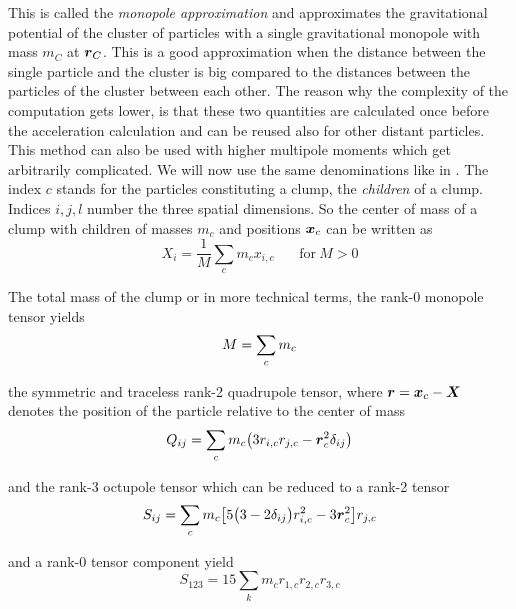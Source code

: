 This is called the \emph{monopole approximation} and approximates the gravitational potential of the cluster of particles with a single gravitational monopole with mass $m_C$ at $\boldsymbol{r}_C$. This is a good approximation when the distance between the single particle and the cluster is big compared to the distances between the particles of the cluster between each other. The reason why the complexity of the computation gets lower, is that these two quantities are calculated once before the acceleration calculation and can be reused also for other distant particles. \\

This method can also be used with higher multipole moments which get arbitrarily complicated. We will now use the same denominations like in \cite{1993ApJ...414..200M}. The index $c$ stands for the particles constituting a clump, the \emph{children} of a clump. Indices $i, j, l$ number the three spatial dimensions. So the center of mass of a clump with children of masses $m_{c}$ and positions $\boldsymbol{x}_{c}$ can be written as
\begin{equation}
X_{i} = \frac{1}{M} \sum_{c} m_{c} x_{i, c} ~~~~~~~~ \text{for}~M > 0
\end{equation}

The total mass of the clump or in more technical terms, the rank-0 monopole tensor yields
\begin{equation}
M = \sum_{c} m_c \\
\end{equation}

the symmetric and traceless rank-2 quadrupole tensor, where $\boldsymbol{r} = \boldsymbol{x}_{c} - \boldsymbol{X} $ denotes the position of the particle relative to the center of mass
\begin{equation}
Q_{ij} = \sum_{c} m_c \big( 3 r_{i, c} r_{j, c} - \boldsymbol{r}_{c}^2 \delta_{i j} \big) \\
\end{equation}

and the rank-3 octupole tensor which can be reduced to a rank-2 tensor
\begin{equation}
S_{ij}  = \sum_{c} m_c \big[ 5 \big( 3 - 2  \delta_{i j} \big) r_{i, c}^2 - 3 \boldsymbol{r}_{c}^2 \big] r_{j, c}\\
\end{equation}

and a rank-0 tensor component yield
\begin{equation}
S_{1 2 3} = 15 \sum_{k} m_c r_{1, c} r_{2, c} r_{3, c}
\end{equation}

